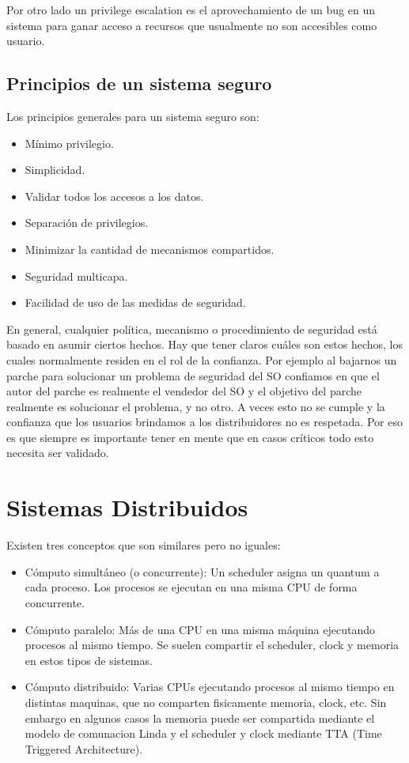 \documentclass{article}
\begin{document}
Por otro lado un privilege escalation es el aprovechamiento de un bug en un sistema para ganar acceso a recursos que usualmente no son accesibles como usuario.

\subsection{Principios de un sistema seguro}

Los principios generales para un sistema seguro son:
\begin{itemize}
\item Mínimo privilegio.
\item Simplicidad.
\item Validar todos los accesos a los datos.
\item Separación de privilegios.
\item Minimizar la cantidad de mecanismos compartidos.
\item Seguridad multicapa.
\item Facilidad de uso de las medidas de seguridad.
\end{itemize}

En general, cualquier política, mecanismo o procedimiento de seguridad está basado en asumir ciertos hechos. Hay que tener claros cuáles son estos hechos, los cuales normalmente residen en el rol de la confianza. Por ejemplo al bajarnos un parche para solucionar un problema de seguridad del SO confiamos en que el autor del parche es realmente el vendedor del SO y el objetivo del parche realmente es solucionar el problema, y no otro. A veces esto no se cumple y la confianza que los usuarios brindamos a los distribuidores no es respetada. Por eso es que siempre es importante tener en mente que en casos críticos todo esto necesita ser validado.

\section{Sistemas Distribuidos}

Existen tres conceptos que son similares pero no iguales:

\begin{itemize}
\item C\'omputo simult\'aneo (o concurrente): Un scheduler asigna un quantum a cada proceso. Los procesos se ejecutan en una misma CPU de forma concurrente.
\item C\'omputo paralelo: M\'as de una CPU en una misma m\'aquina ejecutando procesos al mismo tiempo. Se suelen compartir el scheduler, clock y memoria en estos tipos de sistemas.
\item C\'omputo distribuido: Varias CPUs ejecutando procesos al mismo tiempo en distintas maquinas, que no comparten fisicamente memoria, clock, etc. Sin embargo en algunos casos la memoria puede ser compartida mediante el modelo de comunacion Linda y el scheduler y clock mediante TTA (Time Triggered Architecture).
\end{itemize}
\end{document}

